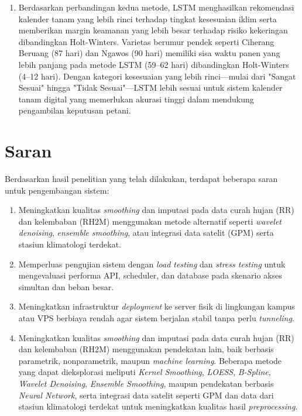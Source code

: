\begin{enumerate}
    \item Berdasarkan perbandingan kedua metode, LSTM menghasilkan rekomendasi kalender tanam yang lebih rinci terhadap tingkat kesesuaian iklim serta memberikan margin keamanan yang lebih besar terhadap risiko kekeringan dibandingkan Holt-Winters. Varietas berumur pendek seperti Ciherang Beruang (87 hari) dan Ngawos (90 hari) memiliki sisa waktu panen yang lebih panjang pada metode LSTM (59–62 hari) dibandingkan Holt-Winters (4–12 hari). Dengan kategori kesesuaian yang lebih rinci—mulai dari "Sangat Sesuai" hingga "Tidak Sesuai"—LSTM lebih sesuai untuk sistem kalender tanam digital yang memerlukan akurasi tinggi dalam mendukung pengambilan keputusan petani.
\end{enumerate}

\section{Saran}
Berdasarkan hasil penelitian yang telah dilakukan, terdapat beberapa saran untuk pengembangan sistem:
\begin{enumerate}
    \item Meningkatkan kualitas \textit{smoothing} dan imputasi pada data curah hujan (RR) dan kelembaban (RH2M) menggunakan metode alternatif seperti \textit{wavelet denoising}, \textit{ensemble \textit{smoothing}}, atau integrasi data satelit (GPM) serta stasiun klimatologi terdekat.

    \item Memperluas pengujian sistem dengan \textit{load testing} dan \textit{stress testing} untuk mengevaluasi performa API, scheduler, dan database pada skenario akses simultan dan beban besar.

    \item Meningkatkan infrastruktur \textit{deployment} ke server fisik di lingkungan kampus atau VPS berbiaya rendah agar sistem berjalan stabil tanpa perlu \textit{tunneling}.

    \item Meningkatkan kualitas \textit{smoothing} dan imputasi pada data curah hujan (RR) dan kelembaban (RH2M) menggunakan pendekatan lain, baik berbasis parametrik, nonparametrik, maupun \textit{machine learning}. Beberapa metode yang dapat dieksplorasi meliputi \textit{Kernel Smoothing}, \textit{LOESS}, \textit{B-Spline}, \textit{Wavelet Denoising}, \textit{Ensemble Smoothing}, maupun pendekatan berbasis \textit{Neural Network}, serta integrasi data satelit seperti GPM dan data dari stasiun klimatologi terdekat untuk meningkatkan kualitas hasil \textit{preprocessing}.
\end{enumerate} 

